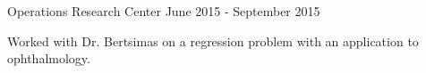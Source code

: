 \begin{cventries}
  \cventry
    {Operations Research Center} %
    {} %
    {} %
    {June 2015 - September 2015} %
    {
      \begin{cvitems} %
        \item {Worked with Dr. Bertsimas on a regression problem
        with an application to ophthalmology.}
      \end{cvitems}
    }

\end{cventries}
